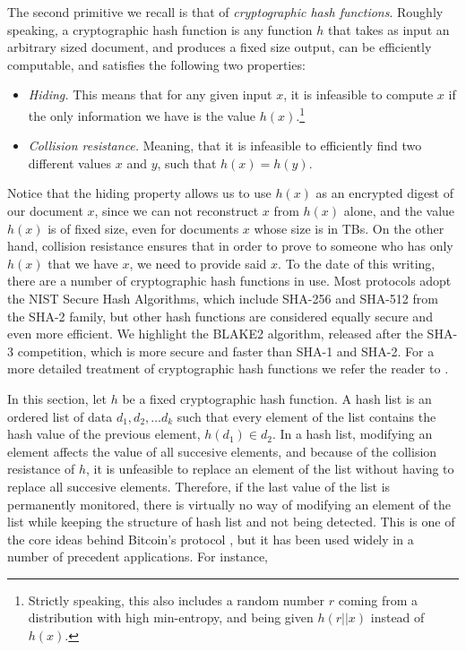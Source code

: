 The second primitive we recall is that of {\em cryptographic hash functions}. Roughly speaking, a cryptographic hash function is any function $h$ that takes as input an arbitrary sized document, and produces a fixed size output, can be efficiently computable, and satisfies the following two properties:
\begin{itemize}
\item {\em Hiding.} This means that for any given input $x$, it is infeasible to compute $x$ if the only information we have is the value $h(x)$.\footnote{Strictly speaking, this also includes a random number $r$ coming from a distribution with high min-entropy, and being given $h(r||x)$ instead of $h(x)$.}
\item {\em Collision resistance.} Meaning, that it is infeasible to efficiently find two different values $x$ and $y$, such that $h(x)=h(y)$.
\end{itemize}
Notice that the hiding property allows us to use $h(x)$ as an encrypted digest of our document $x$, since we can not reconstruct $x$ from $h(x)$ alone, and the value $h(x)$ is of fixed size, even for documents $x$ whose size is in TBs. On the other hand, collision resistance ensures that in order to prove to someone who has only $h(x)$ that we have $x$, we need to provide said $x$. To the date of this writing, there are a number of cryptographic hash functions in use. Most protocols adopt the NIST Secure Hash Algorithms\cite{sha_standard}, which include SHA-256 and SHA-512 from the SHA-2 family, but other hash functions are considered equally secure and even more efficient. We highlight the BLAKE2 algorithm, released after the SHA-3 competition, which is more secure and faster than SHA-1 and SHA-2. For a more detailed treatment of cryptographic hash functions we refer the reader to \cite{sha_standard,aumasson,sha3zoo,bitcoinbook}. 

\medskip
{}
In this section, let $h$ be a fixed cryptographic hash function. A hash list is an ordered list of data $d_1,d_2,\dots d_k$ such that every element of the list contains the hash value of the previous element, \ie $h(d_1)\in d_2$. In a hash list, modifying an element affects the value of all succesive elements, and because of the collision resistance of $h$, it is unfeasible to replace an element of the list without having to replace all succesive elements. Therefore, if the last value of the list is permanently monitored, there is virtually no way of modifying an element of the list while keeping the structure of hash list and not being detected. This is one of the core ideas behind Bitcoin's protocol \cite{whitepaper}, but it has been used widely in a number of precedent applications. For instance, 

